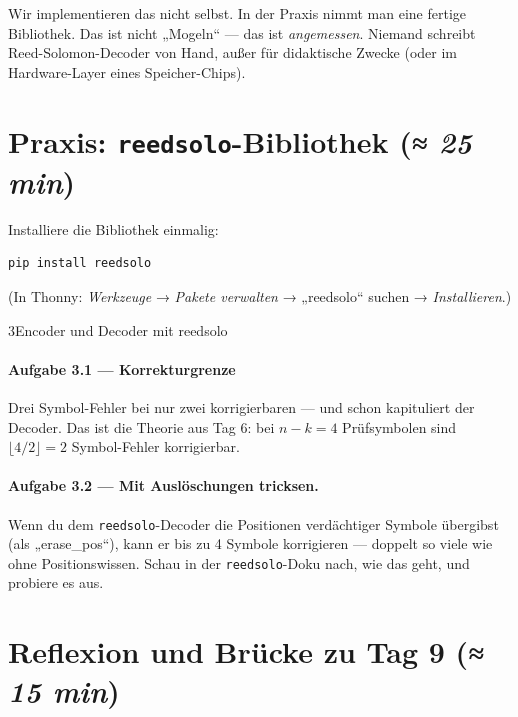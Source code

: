 Wir implementieren das nicht selbst. In der Praxis nimmt man eine
fertige Bibliothek. Das ist nicht „Mogeln“ — das ist
\emph{angemessen}. Niemand schreibt Reed-Solomon-Decoder von Hand,
außer für didaktische Zwecke (oder im Hardware-Layer eines
Speicher-Chips).

\section{Praxis: \texttt{reedsolo}-Bibliothek \normalfont(\textit{≈ 25 min})}

Installiere die Bibliothek einmalig:
\begin{verbatim}
pip install reedsolo
\end{verbatim}

(In Thonny: \emph{Werkzeuge} → \emph{Pakete verwalten} → „reedsolo“
suchen → \emph{Installieren}.)

\begin{pythoneinheit}{3}{Encoder und Decoder mit reedsolo}

\paragraph{Aufgabe 3.1 — Korrekturgrenze}

Drei Symbol-Fehler bei nur zwei korrigierbaren — und schon kapituliert
der Decoder. Das ist die Theorie aus Tag 6: bei $n - k = 4$
Prüfsymbolen sind $\lfloor 4/2 \rfloor = 2$ Symbol-Fehler korrigierbar.

\paragraph{Aufgabe 3.2 — Mit Auslöschungen tricksen.}
Wenn du dem \texttt{reedsolo}-Decoder die Positionen verdächtiger
Symbole übergibst (als „erase\_pos“), kann er bis zu 4 Symbole
korrigieren — doppelt so viele wie ohne Positionswissen. Schau in der
\texttt{reedsolo}-Doku nach, wie das geht, und probiere es aus.
\end{pythoneinheit}

\section{Reflexion und Brücke zu Tag 9 \normalfont(\textit{≈ 15 min})}

